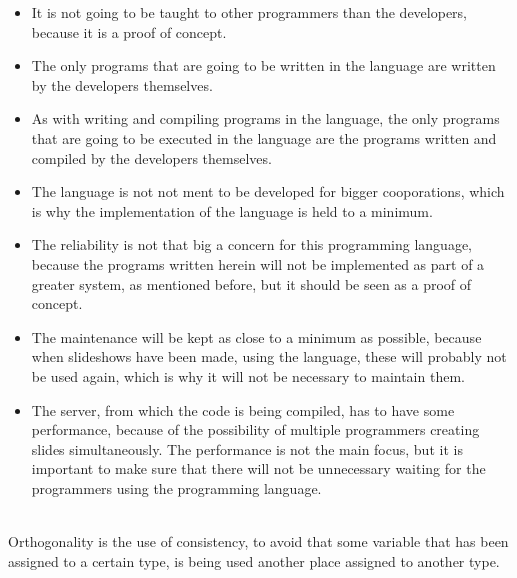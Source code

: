 \begin{itemize}
	\item It is not going to be taught to other programmers than the developers, because it is a proof of concept.
	\item The only programs that are going to be written in the language are written by the developers themselves.
	\item As with writing and compiling programs in the language, the only programs that are going to be executed in the language are the programs written and compiled by the developers themselves.
  \item The language is not not ment to be developed for bigger cooporations, which is why the implementation of the language is held to a minimum.
	\item The reliability is not that big a concern for this programming language, because the programs written herein will not be implemented as part of a greater system, as mentioned before, but it should be seen as a proof of concept.
	\item The maintenance will be kept as close to a minimum as possible, because when slideshows have been made, using the language, these will probably not be used again, which is why it will not be necessary to maintain them.
	\item The server, from which the code is being compiled, has to have some performance, because of the possibility of multiple programmers creating slides simultaneously. The performance is not the main focus, but it is important to make sure that there will not be unnecessary waiting for the programmers using the programming language. \\
\end{itemize}
 \\
Orthogonality is the use of consistency, to avoid that some variable that has been assigned to a certain type, is being used another place assigned to another type.
\\ \\
